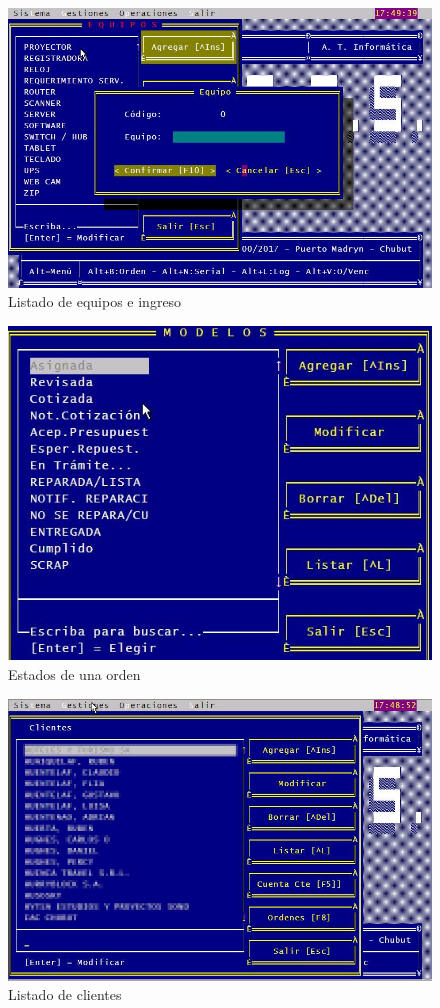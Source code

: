 \documentclass[12pt]{extarticle}
\begin{document}
	\begin{figure}[h]
	\includegraphics[scale=0.5]{images/equipo_e_ingreso.jpg}
	\caption{Listado de equipos e ingreso}
	\end{figure}

	\begin{figure}[h]
	\includegraphics[scale=0.5]{images/estados_orden.jpg}
	\caption{Estados de una orden}
	\end{figure}

	\begin{figure}[h]
	\includegraphics[scale=0.5]{images/listado_clientes.jpg}
	\caption{Listado de clientes}
	\end{figure}
\end{document}
